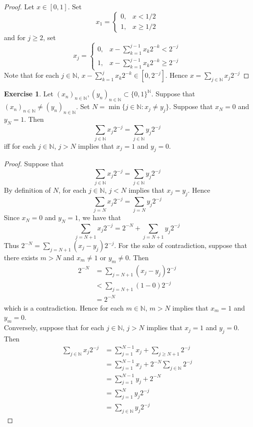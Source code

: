 \documentclass{book}
\theoremstyle{definition}
\newtheorem{ex}[definition]{Exercise}
\newcommand{\N}{\mathbb{N}}
\newcommand{\lex}[1]{\label{ex:#1}}
\DeclareMathOperator*{\0}{\mbf{0}}
\DeclareMathOperator*{\1}{\mbf{1}}
\begin{document}
	\begin{proof}
		Let $x \in [0,1]$. Set 
		$$x_1 = 
		\begin{cases}
			0, & x < 1/2 \\
			1, & x \geq 1/2 
		\end{cases}$$
		and for $j \geq 2$, set 
		$$x_j = \begin{cases}
			0, & x - \sum\limits_{k = 1}^{j-1}x_k2^{-k} < 2^{-j} \\
			1, & x - \sum\limits_{k = 1}^{j-1}x_k2^{-k} \geq 2^{-j} 
		\end{cases}$$
		Note that for each $j \in \N$, $x - \sum\limits_{k = 1}^{j}x_k2^{-k} \in [0, 2^{-j}]$. Hence $x = \sum\limits_{j \in \N} x_j2^{-j}$
	\end{proof}
	
	\begin{ex} \lex{28002} 
		Let $(x_n)_{n \in \N}, (y_n)_{n \in \N} \subset \{0,1\}^{\N}$. Suppose that $(x_n)_{n \in \N} \neq (y_n)_{n \in \N}$. Set $N = \min\{j \in \N: x_j \neq y_j\}$. Suppose that $x_N = 0$ and $y_N = 1$. Then
		$$\sum\limits_{j \in \N} x_j 2^{-j} = \sum\limits_{j \in \N} y_j 2^{-j}$$ 
		iff for each $j \in \N$, $j > N$ implies that $x_j = 1$ and $y_j = 0$. 
	\end{ex}
	
	\begin{proof}
		Suppose that 
		$$\sum\limits_{j \in \N} x_j 2^{-j} = \sum\limits_{j \in \N} y_j 2^{-j}$$
		By definition of $N$, for each $j \in \N$, $j < N$ implies that $x_j = y_j$. Hence 
		$$\sum\limits_{j = N} x_j 2^{-j} = \sum\limits_{j = N} y_j 2^{-j}$$ 
		Since $x_N = 0$ and $y_N = 1$, we have that 
		$$\sum\limits_{j = N +1} x_j 2^{-j} = 2^{-N} + \sum\limits_{j = N+1} y_j 2^{-j}$$ 
		Thus $2^{-N} = \sum\limits_{j = N+1} (x_j - y_j) 2^{-j}$. For the sake of contradiction, suppose that there exists $m > N$ and $x_m \neq 1$ or $y_m \neq 0$. Then
		\begin{align*}
			2^{-N} 
			&= \sum\limits_{j = N+1} (x_j - y_j) 2^{-j} \\
			& < \sum\limits_{j = N+1} (1 - 0) 2^{-j} \\
			& = 2^{-N}
		\end{align*}
		which is a contradiction. Hence for each $m \in \N$, $m > N$ implies that $x_m = 1$ and $y_m = 0$. \vspace{.2cm}\\
		Conversely, suppose that for each $j \in \N$, $j > N$ implies that $x_j = 1$ and $y_j = 0$. Then 
		\begin{align*}
			\sum\limits_{j \in \N} x_j 2^{-j}
			& = \sum_{j=1}^{N-1} x_j + \sum_{j \geq N+1} 2^{-j} \\
			& = \sum_{j=1}^{N-1} x_j + 2^{-N} \sum_{j \in \N} 2^{-j} \\
			& = \sum_{j=1}^{N-1} y_j + 2^{-N} \\
			& = \sum_{j=1}^N y_j2^{-j} \\
			& = \sum\limits_{j \in \N} y_j 2^{-j}
		\end{align*}
	\end{proof}
	
\end{document}
